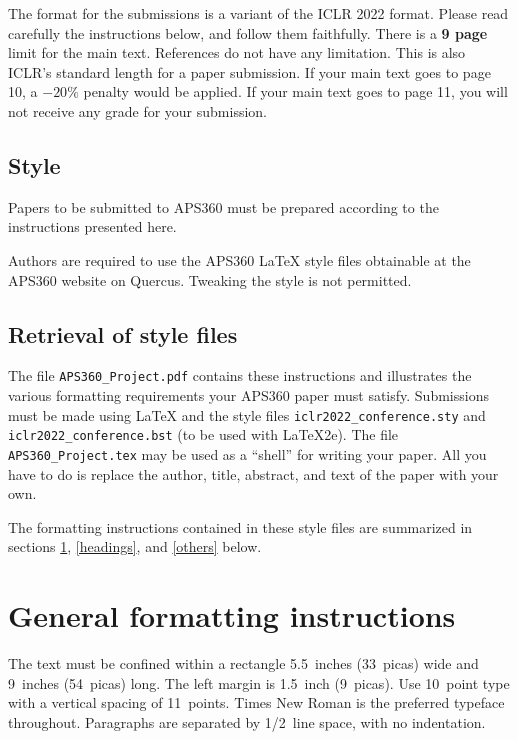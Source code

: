 \documentclass{article} %
\begin{document}
The format for the submissions is a variant of the ICLR 2022 format.
Please read carefully the instructions below, and follow them
faithfully. There is a \textbf{9 page} limit for the main text. References do not have any limitation. This is also ICLR's standard length for a paper submission. 
If your main text goes to page 10, a $-20\%$ penalty would be applied. If your main text goes to page 11, you will not receive any grade for your submission. 

\subsection{Style}

Papers to be submitted to APS360 must be prepared according to the
instructions presented here.

Authors are required to use the APS360 \LaTeX{} style files obtainable at the
APS360 website on Quercus. Tweaking the style is not permitted.

\subsection{Retrieval of style files}

The file \verb+APS360_Project.pdf+ contains these
instructions and illustrates the various formatting requirements your APS360 paper must satisfy.
Submissions must be made using \LaTeX{} and the style files
\verb+iclr2022_conference.sty+ and \verb+iclr2022_conference.bst+ (to be used with \LaTeX{}2e). The file
\verb+APS360_Project.tex+ may be used as a ``shell'' for writing your paper. All you have to do is replace the author, title, abstract, and text of the paper with
your own.

The formatting instructions contained in these style files are summarized in
sections \ref{gen_inst}, \ref{headings}, and \ref{others} below.

\section{General formatting instructions}
\label{gen_inst}

The text must be confined within a rectangle 5.5~inches (33~picas) wide and
9~inches (54~picas) long. The left margin is 1.5~inch (9~picas).
Use 10~point type with a vertical spacing of 11~points. Times New Roman is the
preferred typeface throughout. Paragraphs are separated by 1/2~line space,
with no indentation.
\end{document}
